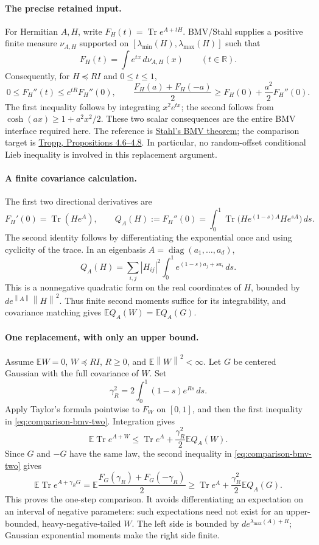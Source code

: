 \documentclass[11pt,a4paper]{article}
\newcommand{\R}{\mathbb R}
\newcommand{\norm}[1]{\left\lVert#1\right\rVert}
\DeclareMathOperator{\diag}{diag}
\begin{document}
\paragraph{The precise retained input.}
For Hermitian $A,H$, write $F_H(t)=\operatorname{Tr}e^{A+tH}$.
BMV/Stahl supplies a positive finite measure $\nu_{A,H}$ supported on
$[\lambda_{\min}(H),\lambda_{\max}(H)]$ such that
\[
 F_H(t)=\int e^{tx}\,d\nu_{A,H}(x)\qquad(t\in\R).
\]
Consequently, for $H\preceq RI$ and $0\le t\le1$,
\begin{equation}\label{eq:comparison-bmv-two}
 0\le F_H''(t)\le e^{tR}F_H''(0),\qquad
 \frac{F_H(a)+F_H(-a)}2\ge F_H(0)+\frac{a^2}2F_H''(0).
\end{equation}
The first inequality follows by integrating $x^2e^{tx}$; the second follows
from $\cosh(ax)\ge1+a^2x^2/2$.  These two scalar consequences are the entire
BMV interface required here.  The reference is
\href{https://arxiv.org/abs/1107.4875v3}{Stahl's BMV theorem}; the comparison
target is \href{https://arxiv.org/html/2603.04365v5#S4.SS6}{Tropp,
Propositions 4.6--4.8}.  In particular, no random-offset conditional Lieb
inequality is involved in this replacement argument.

\paragraph{A finite covariance calculation.}
The first two directional derivatives are
\[
 F_H'(0)=\operatorname{Tr}(He^A),\qquad
 Q_A(H):=F_H''(0)
 =\int_0^1\operatorname{Tr}\bigl(H e^{(1-s)A}H e^{sA}\bigr)\,ds.
\]
The second identity follows by differentiating the exponential once and
using cyclicity of the trace.  In an eigenbasis $A=\diag(a_1,\ldots,a_d)$,
\[
 Q_A(H)=\sum_{i,j}|H_{ij}|^2
       \int_0^1e^{(1-s)a_j+sa_i}\,ds.
\]
This is a nonnegative quadratic form on the real coordinates of $H$,
bounded by $d e^{\norm{A}}\norm{H}^2$.  Thus finite second moments suffice
for its integrability, and covariance matching gives
$\mathbb E Q_A(W)=\mathbb E Q_A(G)$.

\paragraph{One replacement, with only an upper bound.}
Assume $\mathbb EW=0$, $W\preceq RI$, $R\ge0$, and
$\mathbb E\norm{W}^2<\infty$.  Let $G$ be centered Gaussian with the full
covariance of $W$.  Set
\[
 \gamma_R^2=2\int_0^1(1-s)e^{Rs}\,ds.
\]
Apply Taylor's formula pointwise to $F_W$ on $[0,1]$, and then the first
inequality in \eqref{eq:comparison-bmv-two}.  Integration gives
\[
 \mathbb E\operatorname{Tr}e^{A+W}
 \le\operatorname{Tr}e^A+\frac{\gamma_R^2}{2}\mathbb E Q_A(W).
\]
Since $G$ and $-G$ have the same law, the second inequality in
\eqref{eq:comparison-bmv-two} gives
\[
 \mathbb E\operatorname{Tr}e^{A+\gamma_RG}
 =\mathbb E\frac{F_G(\gamma_R)+F_G(-\gamma_R)}2
 \ge\operatorname{Tr}e^A+\frac{\gamma_R^2}{2}\mathbb E Q_A(G).
\]
This proves the one-step comparison.  It avoids differentiating an
expectation on an interval of negative parameters: such expectations
need not exist for an upper-bounded, heavy-negative-tailed $W$.
The left side is bounded by $d e^{\lambda_{\max}(A)+R}$; Gaussian
exponential moments make the right side finite.
\end{document}

